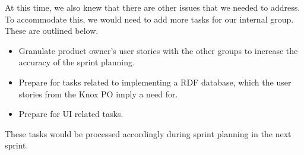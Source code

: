 At this time, we also knew that there are other issues that we needed to address. To accommodate this, we would need to add more tasks for our internal group. These are outlined below.

\begin{itemize}
    \item Granulate product owner's user stories with the other \knox{} groups to increase the accuracy of the sprint planning.
    \item Prepare for tasks related to implementing a RDF database, which the user stories from the Knox PO imply a need for.
    \item Prepare for UI related tasks.
\end{itemize}

These tasks would be processed accordingly during sprint planning in the next sprint.